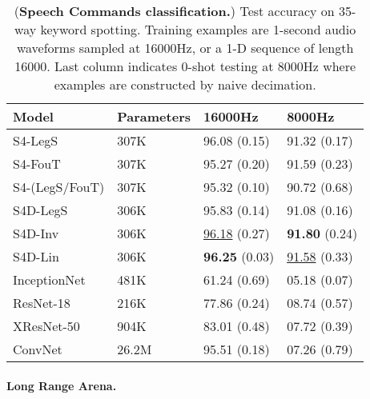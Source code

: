\documentclass{article}
\begin{document}
\begin{table}[!t]
  \small
  \centering
  \caption{
    (\textbf{Speech Commands classification.})
    Test accuracy on 35-way keyword spotting. Training examples are 1-second audio waveforms sampled at 16000Hz, or a 1-D sequence of length 16000.
    Last column indicates 0-shot testing at 8000Hz where examples are constructed by naive decimation.
  }
    \begin{tabular}{@{}llll@{}}
      \toprule
      Model          & Parameters & 16000Hz                  & 8000Hz                   \\
      \midrule
      S4-LegS        & 307K       & 96.08 (0.15)             & 91.32 (0.17)             \\
      S4-FouT        & 307K       & 95.27 (0.20)             & 91.59 (0.23)             \\
      S4-(LegS/FouT) & 307K       & 95.32 (0.10)             & 90.72 (0.68)             \\
      \midrule
      S4D-LegS       & 306K       & 95.83 (0.14)             & 91.08 (0.16)             \\
      S4D-Inv        & 306K       & \underline{96.18} (0.27) & \textbf{91.80} (0.24)    \\
      S4D-Lin        & 306K       & \textbf{96.25} (0.03)    & \underline{91.58} (0.33) \\
      \midrule
      InceptionNet   & 481K       & 61.24 (0.69)             & 05.18 (0.07)             \\
      ResNet-18      & 216K       & 77.86 (0.24)             & 08.74 (0.57)             \\
      XResNet-50     & 904K       & 83.01 (0.48)             & 07.72 (0.39)             \\
      ConvNet        & 26.2M      & 95.51 (0.18)             & 07.26 (0.79)             \\
      \bottomrule
    \end{tabular}
    \label{tab:sc-full}
\end{table}

\paragraph{Long Range Arena.}
\end{document}
